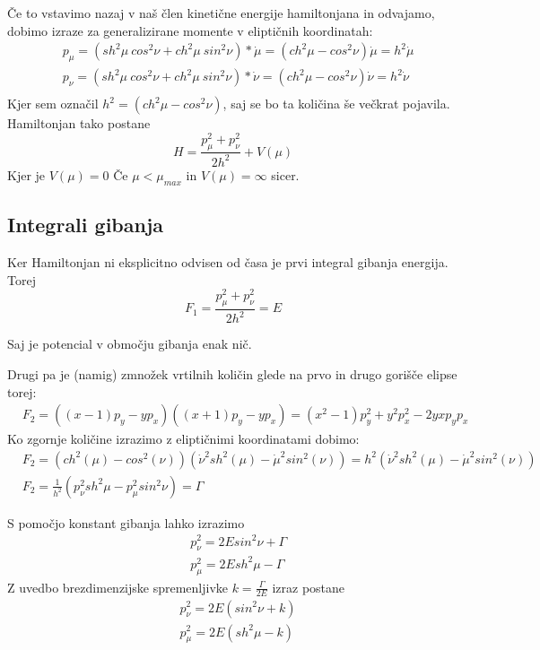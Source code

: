 \documentclass{article}
\begin{document}
Če to vstavimo nazaj v naš člen kinetične energije hamiltonjana in odvajamo, dobimo izraze za generalizirane momente v eliptičnih koordinatah:
\begin{align*}
&p_{\mu} =  (sh^2 \mu \ cos^2 \nu + ch^2 \mu \ sin^2 \nu) * \dot{\mu} = (ch^2 \mu - cos^2 \nu) \dot{\mu}= h^2 \dot{\mu} \\
&p_{\nu} =  (sh^2 \mu \ cos^2 \nu + ch^2 \mu \ sin^2 \nu) * \dot{\nu} = (ch^2 \mu - cos^2 \nu)\dot{\nu} = h^2 \dot{\nu}\\
\end{align*}
Kjer sem označil $h^2 = (ch^2 \mu - cos^2 \nu)$, saj se bo ta količina še večkrat pojavila.
Hamiltonjan tako postane
\begin{equation*}
H = \frac{p_{\mu}^2 + p_{\nu}^2}{2 h^2} + V(\mu)
\end{equation*}
Kjer je $V(\mu) =0$ Če $\mu < \mu_{max}$ in $V(\mu) = \infty$ sicer.
\subsection{Integrali gibanja}

Ker Hamiltonjan ni eksplicitno odvisen od časa je prvi integral gibanja energija. Torej 
\begin{equation*}
F_1 = \frac{p_{\mu}^2 + p_{\nu}^2}{2 h^2} = E
\end{equation*}

Saj je potencial v območju gibanja enak nič.

Drugi pa je (namig) zmnožek vrtilnih količin glede na prvo in drugo gorišče elipse torej:
\begin{align*}
&F_2 = ((x-1) p_{y} - y p_{x})((x+1) p_{y} - y p_{x}) = (x^2-1)p_y^2 + y^2 p_x^2 - 2yx p_y p_x  
\end{align*}
Ko zgornje količine izrazimo z eliptičnimi koordinatami dobimo:
\begin{align*}
&F_2 =  (ch^2(\mu) - cos^2(\nu))(\dot{\nu}^2 sh^2(\mu) - \dot{\mu}^2 sin^2(\nu)) =   h^2 (\dot{\nu}^2 sh^2(\mu) - \dot{\mu}^2 sin^2(\nu)) \\
&F_2 = \frac{1}{h^2} (p_{\nu}^2 sh^2 \mu - p_{\mu}^2 sin^2 \nu) = \Gamma
\end{align*}

S pomočjo konstant gibanja lahko izrazimo
\begin{align*}
&p_{\nu}^2 = 2E sin^2 \nu + \Gamma  \\
&p_{\mu}^2 = 2E sh^2 \mu - \Gamma
\end{align*}
Z uvedbo brezdimenzijske spremenljivke $k = \frac{\Gamma}{2E}$ izraz postane
\begin{align*}
&p_{\nu}^2 = 2E (sin^2 \nu + k)  \\
&p_{\mu}^2 = 2E (sh^2 \mu - k)
\end{align*}
\end{document}
